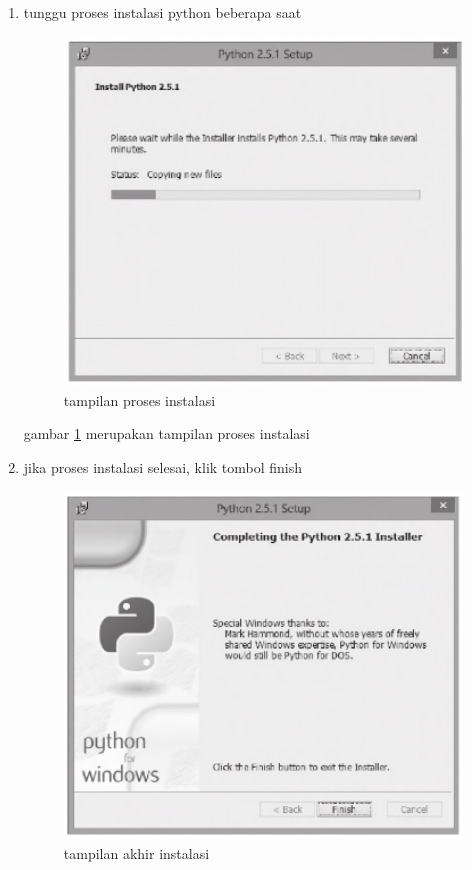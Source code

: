 \begin {enumerate}
	gambar \ref {komponen} merupakan tampilan komponen instalasi python

	\item
	tunggu proses instalasi python beberapa saat
	
	\begin{figure}[ht]
	\centerline{\includegraphics[width=1\textwidth]{figures/proses.PNG}}
	\caption{tampilan proses instalasi}
	\label{proses}
	\end{figure}
	
	gambar \ref {proses} merupakan tampilan proses instalasi

	\item
	jika proses instalasi selesai, klik tombol finish
	
	\begin{figure}[ht]
	\centerline{\includegraphics[width=1\textwidth]{figures/selesai.PNG}}
	\caption{tampilan akhir instalasi}
	\label{selesai}
	\end{figure}
	

\end{enumerate}
